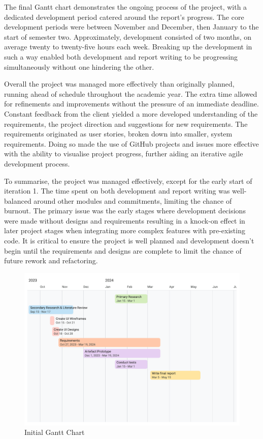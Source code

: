 The final Gantt chart demonstrates the ongoing process of the project, with a dedicated development period catered around the report's progress. The core development periods were between November and December, then January to the start of semester two. Approximately, development consisted of two months, on average twenty to twenty-five hours each week. Breaking up the development in such a way enabled both development and report writing to be progressing simultaneously without one hindering the other.

Overall the project was managed more effectively than originally planned, running ahead of schedule throughout the academic year. The extra time allowed for refinements and improvements without the pressure of an immediate deadline. Constant feedback from the client yielded a more developed understanding of the requirements, the project direction and suggestions for new requirements. The requirements originated as user stories, broken down into smaller, system requirements. Doing so made the use of GitHub projects and issues more effective with the ability to visualise project progress, further aiding an iterative agile development process.

To summarise, the project was managed effectively, except for the early start of iteration 1. The time spent on both development and report writing was well-balanced around other modules and commitments, limiting the chance of burnout. The primary issue was the early stages where development decisions were made without designs and requirements resulting in a knock-on effect in later project stages when integrating more complex features with pre-existing code. It is critical to ensure the project is well planned and development doesn't begin until the requirements and designs are complete to limit the chance of future rework and refactoring.

\begin{figure}[h!]
    \centering
    \includegraphics[width=1\linewidth]{figures/Old FYP Gantt - Timeline 1.pdf}
    \caption{Initial Gantt Chart}
    \label{fig:initial-gantt}
\end{figure}

